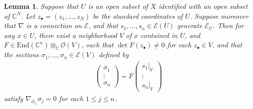\documentclass[12pt,a4paper,notitlepage]{report}
\theoremstyle{definition}
\theoremstyle{plain}
\newtheorem{lm}[df]{Lemma}
\newcommand{\End}{\mathrm{End}} %
\newcommand{\scr}{\mathscr}
\newcommand{\mbb}{\mathbb}
\newcommand{\blt}{\bullet}
\newcommand{\Cbb}{\mathbb C}
\numberwithin{equation}{section}
\begin{document}
\begin{lm}\label{lb16}
Suppose that $U$ is an open subset of $X$ identified with an open subset of $\mbb C^N$. Let $z_\blt=(z_1,\dots,z_N)$ be the standard coordinates of $U$. Suppose moreover that $\nabla$ is a connection on $\scr E$, and that $s_1,\dots,s_n\in\scr E(U)$ generate $\scr E_U$. Then for any $x\in U$,  there exist a neighborhood $V$ of $x$ contained in $U$, and $F\in\End(\Cbb^n)\otimes_\Cbb\scr O(V)$, such that $\det F(z_\blt)\neq0$ for each $z_\blt\in V$, and that the sections $\sigma_1,\dots,\sigma_n\in\scr E(V)$ defined by
\begin{gather}
\left( \begin{array}{c}
\sigma_1 \\
\vdots \\
\sigma_n
\end{array} \right)
=F
\left( \begin{array}{c}
s_1|_V \\
\vdots \\
s_n|_V
\end{array} \right)   \label{eq30}
\end{gather}
satisfy $\nabla_{\partial_{z_1}}\sigma_j=0$ for each $1\leq j\leq n$.
\end{lm}
\end{document}
